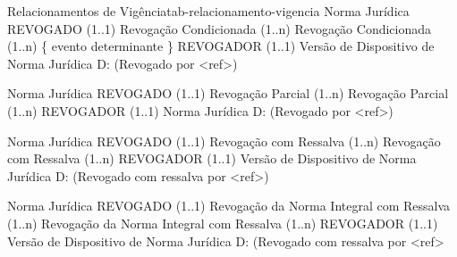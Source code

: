 \begin{tabelarelacionamento}{Relacionamentos
de Vigência}{tab-relacionamento-vigencia}
  \relacionamento
  	{Norma Jurídica}
 	{REVOGADO (1..1)}
 	{Revogação Condicionada}
 	{(1..n) Revogação Condicionada (1..n)
 	 \mypar
 	 \{ evento determinante \}}
 	{REVOGADOR (1..1)}
 	{Versão de Dispositivo de Norma Jurídica}
 	{D: (Revogado por <ref>)}

  \relacionamento
  	{Norma Jurídica}
 	{REVOGADO (1..1)}
 	{Revogação Parcial}
 	{(1..n) Revogação Parcial (1..n)
 	 }
 	{REVOGADOR (1..1)}
 	{Norma Jurídica}
 	{D: (Revogado por <ref>)}

  \relacionamento
  	{Norma Jurídica}
 	{REVOGADO (1..1)}
 	{Revogação com Ressalva}
 	{(1..n) Revogação com Ressalva (1..n)}
 	{REVOGADOR (1..1)}
 	{Versão de Dispositivo de Norma Jurídica}
 	{D: (Revogado com ressalva por <ref>)}

  \relacionamento
  	{Norma Jurídica}
 	{REVOGADO (1..1)}
 	{Revogação da Norma Integral com Ressalva}
 	{(1..n) Revogação da Norma Integral com Ressalva (1..n)}
 	{REVOGADOR (1..1)}
 	{Versão de Dispositivo de Norma Jurídica}
 	{D: (Revogado com ressalva por <ref>}

\end{tabelarelacionamento}


